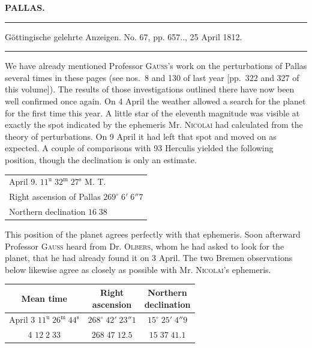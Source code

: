\clearpage{}\hypertarget{native-354-lower}{}\label{native-354-lower}
\begin{center}\textbf{PALLAS.}\par\vspace{4pt}\hrule\vspace{4pt}\fontsize{10}{12}\selectfont Göttingische gelehrte Anzeigen. No. 67, pp. 657\;.., 25 April 1812.\par\vspace{4pt}\hrule\vspace{4pt}\end{center}

\par\indent We have already mentioned Professor \textsc{Gauss}’s work on the perturbations of Pallas several times in these pages (see nos.~8 and 130 of last year [pp.~322 and 327 of this volume]). The results of those investigations outlined there have now been well confirmed once again. On 4 April the weather allowed a search for the planet for the first time this year. A little star of the eleventh magnitude was visible at exactly the spot indicated by the ephemeris Mr. \textsc{Nicolai} had calculated from the theory of perturbations. On 9 April it had left that spot and moved on as expected. A couple of comparisons with 93 Herculis yielded the following position, though the declination is only an estimate.

\begin{center}\fontsize{10}{12}\selectfont\setlength{\tabcolsep}{0pt}\renewcommand{\arraystretch}{1.15}\begin{tabular}{l}
April 9. $11^{\mathrm u}\;32^{\mathrm m}\;27^{\mathrm s}$ M. T.\\
Right ascension of Pallas $269^\circ\;6'\;6''7$\\
Northern declination $16\;38$
\end{tabular}\end{center}
\par\indent This position of the planet agrees perfectly with that ephemeris. Soon afterward Professor \textsc{Gauss} heard from Dr. \textsc{Olbers}, whom he had asked to look for the planet, that he had already found it on 3 April. The two Bremen observations below likewise agree as closely as possible with Mr. \textsc{Nicolai}’s ephemeris.

\begin{center}
\fontsize{10}{12}\selectfont\setlength{\tabcolsep}{3pt}\renewcommand{\arraystretch}{1.15}\begin{tabular}{c|c|c}
Mean time & \shortstack{Right\\ascension} & \shortstack{Northern\\declination} \\
\hline
April 3 \quad $11^{\mathrm u}\;26^{\mathrm m}\;44^{\mathrm s}$ & $268^\circ\;42'\;23''1$ & $15^\circ\;25'\;4''9$ \\
\phantom{April} 4 \qquad\quad $12\;2\;33$ & $268\;47\;12.5$ & $15\;37\;41.1$ \\
\end{tabular}
\end{center}

